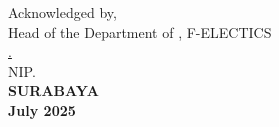 \vspace{\fill}

\begin{center}
  Acknowledged by,\\
  Head of the Department of \engdepartment{}, F-ELECTICS \\
  \vspace{10ex}
  \underline{\headofdepartment{}.} \\
  NIP. \headofdepartmentnip{}\\
  \vspace{10ex}
  \textbf{SURABAYA} \\
  \textbf{July 2025}
\end{center}
\endgroup
